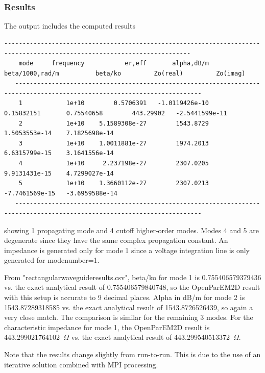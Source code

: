 \documentclass[titlepage]{article}
\renewcommand\_{\textunderscore\linebreak[1]}
\begin{document}
\subsubsection{Results}

The output includes the computed results
\begin{Verbatim}[fontsize=\scriptsize]
   -------------------------------------------------------------------------------------------------------------------------
    mode     frequency           er,eff       alpha,dB/m  beta/1000,rad/m          beta/ko         Zo(real)         Zo(imag)
   -------------------------------------------------------------------------------------------------------------------------
    1            1e+10        0.5706391   -1.0119426e-10       0.15832151       0.75540658        443.29902   -2.5441599e-11
    2            1e+10    5.1589308e-27        1543.8729    1.5053553e-14    7.1825698e-14
    3            1e+10    1.0011881e-27        1974.2013    6.6315799e-15    3.1641556e-14
    4            1e+10     2.237198e-27        2307.0205    9.9131431e-15    4.7299027e-14
    5            1e+10    1.3660112e-27        2307.0213   -7.7461569e-15   -3.6959588e-14
   -------------------------------------------------------------------------------------------------------------------------
\end{Verbatim}
\noindent showing 1 propagating mode and 4 cutoff higher-order modes.  Modes 4 and 5 are degenerate since they have the same complex propagation constant.  An impedance is generated only for mode 1 since a voltage integration line is only generated for modenumber=1.

From "rectangular\_waveguide\_results.csv", beta/ko for mode 1 is 0.755406579379436 vs. the exact analytical result of 0.755406579840748, so the OpenParEM2D result with this setup is accurate to 9 decimal places.  Alpha in dB/m for mode 2 is 1543.87289318585 vs. the exact analytical result of 1543.8726526439, so again a very close match.  The comparison is similar for the remaining 3 modes.  For the characteristic impedance for mode 1, the OpenParEM2D result is 443.299021764102~$\Omega$ vs. the exact analytical result of 443.299540513372~$\Omega$.

Note that the results change slightly from run-to-run.  This is due to the use of an iterative solution combined with MPI processing.
\end{document}

